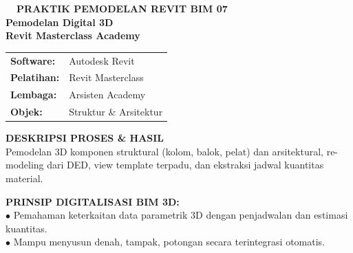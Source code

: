 \documentclass[10pt,a4paper,landscape]{article}
\begin{document}
\noindent
\begin{minipage}[t]{0.30\linewidth}
  \vspace{0pt}
  \begin{tcolorbox}[sharp corners, boxrule=0.8pt, colframe=pborder, colback=white, left=3mm, right=3mm, top=2.5mm, bottom=2.5mm, height=100mm]
    \colorbox{pred}{\fontsize{7pt}{8pt}\selectfont\bfseries\color{white}\ \ PRAKTIK PEMODELAN REVIT BIM 07\ \ }\\[1.5mm]
    {\fontsize{9.5pt}{11.5pt}\selectfont\bfseries\color{pnavy}Pemodelan Digital 3D}\\[0.5mm]
    {\fontsize{7pt}{8.5pt}\selectfont\bfseries\color{pred}Revit Masterclass Academy}\\[2mm]

    \begin{tcolorbox}[sharp corners, boxrule=0.5pt, colframe=pborder, colback=pbglight, left=2mm, right=2mm, top=1.5mm, bottom=1.5mm]
      \begin{tabularx}{\linewidth}{@{}p{22mm} X@{}}
        {\fontsize{6.8pt}{8pt}\selectfont\bfseries Software:} & {\fontsize{6.8pt}{8pt}\selectfont Autodesk Revit} \\[0.8mm]
        {\fontsize{6.8pt}{8pt}\selectfont\bfseries Pelatihan:} & {\fontsize{6.8pt}{8pt}\selectfont Revit Masterclass} \\[0.8mm]
        {\fontsize{6.8pt}{8pt}\selectfont\bfseries Lembaga:} & {\fontsize{6.8pt}{8pt}\selectfont Arsisten Academy} \\[0.8mm]
        {\fontsize{6.8pt}{8pt}\selectfont\bfseries Objek:} & {\fontsize{6.8pt}{8pt}\selectfont Struktur \& Arsitektur}
      \end{tabularx}
    \end{tcolorbox}
    \vspace{1.5mm}

    {\fontsize{7.5pt}{9pt}\selectfont\bfseries\color{pnavy}DESKRIPSI PROSES \& HASIL}\\[0.8mm]
    {\fontsize{6.5pt}{8.2pt}\selectfont\color{psteel}
    Pemodelan 3D komponen struktural (kolom, balok, pelat) dan arsitektural, re-modeling dari DED, view template terpadu, dan ekstraksi jadwal kuantitas material.
    }
  \end{tcolorbox}
  \vspace{2mm}

  \begin{tcolorbox}[sharp corners, boxrule=0.6pt, colframe=pnavy, colback=pbglight, left=2.5mm, right=2.5mm, top=2mm, bottom=2mm, height=52mm]
    {\fontsize{7pt}{8.5pt}\selectfont\bfseries\color{pnavy}PRINSIP DIGITALISASI BIM 3D:}\\[1.5mm]
    {\fontsize{6.5pt}{8.2pt}\selectfont\color{psteel}
    $\bullet$ Pemahaman keterkaitan data parametrik 3D dengan penjadwalan dan estimasi kuantitas.\\
    $\bullet$ Mampu menyusun denah, tampak, potongan secara terintegrasi otomatis.
    }
  \end{tcolorbox}
\end{minipage}%
\end{document}
